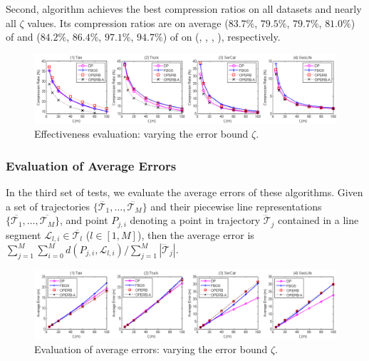 Second, algorithm \operba achieves the best compression ratios on all datasets and nearly all $\zeta$ values.
Its compression ratios are on average ($83.7\%$, $79.5\%$, $79.7\%$, $81.0\%$) of \fbqsa and ($84.2\%$, $86.4\%$, $97.1\%$, $94.7\%$) of \dpa on (\taxi, \truck, \sercar, \geolife), respectively.



\begin{figure}[tb!]
\centering
\includegraphics[scale=0.465]{figures/exp-CompressionRatio.png}
\vspace{-2.5ex}
\caption{\small Effectiveness evaluation: varying the error bound $\zeta$.}
\label{fig:cr}
\vspace{-.5ex}
\end{figure}






\vspace{-0.5ex}
\subsubsection{Evaluation of Average Errors}


In the third set of tests, we evaluate the average errors of these algorithms.
Given a set of trajectories $\{\dddot{\mathcal{T}_1}, \ldots, \dddot{\mathcal{T}_M}\}$ and their piecewise line representations
$\{\overline{\mathcal{T}_1}, \ldots, \overline{\mathcal{T}_M}\}$, and point $P_{j,i}$ denoting
a point in trajectory $\dddot{\mathcal{T}}_j$ contained in a line segment $\mathcal{L}_{l,i}\in\overline{\mathcal{T}_l}$ ($l\in[1,M]$),
then the average error is $\sum_{j=1}^{M}\sum_{i=0}^{M} d(P_{j,i},
\mathcal{L}_{l,i})/\sum_{j=1}^{M}{|\dddot{\mathcal{T}}_j |}$.


\begin{figure}[tb]
	\centering
	\includegraphics[scale = 0.465]{figures/exp-averageerror.png}
	\vspace{-2ex}
	\caption{\small Evaluation of average errors: varying the error bound $\zeta$.}
	\label{fig:ae}
	\vspace{-2ex}
\end{figure}


